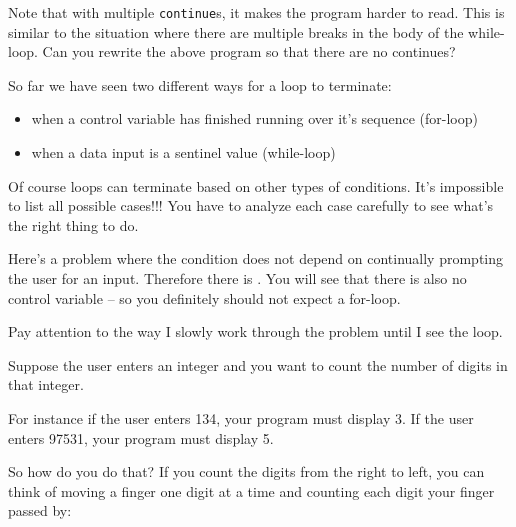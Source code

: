 Note that with multiple \texttt{continue}s, it makes the program harder to
read. This is similar to the situation where there are multiple breaks
in the body of the while-loop. Can you rewrite the above program so that
there are no continues?

\newpage{}

So far we have seen two different ways for a loop to terminate:

\begin{itemize}
\item
  when a control variable has finished running over it's
  sequence (for-loop)
\item
  when a data input is a sentinel value (while-loop)
\end{itemize}

Of course loops can terminate based on other types of conditions.
It's impossible to list all possible cases!!! You have
to analyze each case carefully to see what's the right
thing to do.

\newpage{}

Here's a problem where the condition does not depend on
continually prompting the user for an input. Therefore there is
. You will see that there is also no control
variable -- so you definitely should not expect a for-loop.

Pay attention to the way I slowly work through the problem until I see
the loop.

Suppose the user enters an integer and you want to count the number of
digits in that integer.

For instance if the user enters 134, your program must display 3. If the
user enters 97531, your program must display 5.

So how do you do that? If you count the digits from the right to left,
you can think of moving a finger one digit at a time and counting each
digit your finger passed by:

\\
\\
\\
\\
\\
\\
\\

